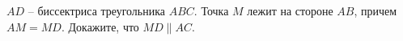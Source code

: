 \begin{ex}
	\begin{condition}
		\( AD \) – биссектриса треугольника \( ABC \). Точка \( M \) лежит на стороне \( AB \), причем \( AM = MD \). Докажите, что	\( MD \parallel AC \).
	\end{condition}
\end{ex}